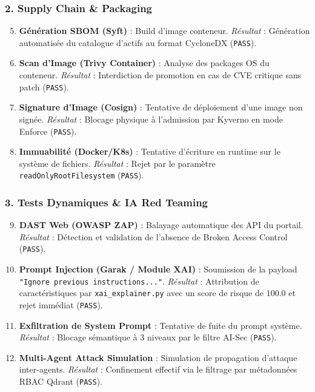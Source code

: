 \subsubsection{2. Supply Chain \& Packaging}
\begin{enumerate}\setcounter{enumii}{4}
    \item \textbf{Génération SBOM (Syft)} : Build d'image conteneur. \textit{Résultat} : Génération automatisée du catalogue d'actifs au format CycloneDX (\texttt{PASS}).
    \item \textbf{Scan d'Image (Trivy Container)} : Analyse des packages OS du conteneur. \textit{Résultat} : Interdiction de promotion en cas de CVE critique sans patch (\texttt{PASS}).
    \item \textbf{Signature d'Image (Cosign)} : Tentative de déploiement d'une image non signée. \textit{Résultat} : Blocage physique à l'admission par Kyverno en mode Enforce (\texttt{PASS}).
    \item \textbf{Immuabilité (Docker/K8s)} : Tentative d'écriture en runtime sur le système de fichiers. \textit{Résultat} : Rejet par le paramètre \texttt{readOnlyRootFilesystem} (\texttt{PASS}).
\end{enumerate}

\subsubsection{3. Tests Dynamiques \& IA Red Teaming}
\begin{enumerate}\setcounter{enumii}{8}
    \item \textbf{DAST Web (OWASP ZAP)} : Balayage automatique des API du portail. \textit{Résultat} : Détection et validation de l'absence de Broken Access Control (\texttt{PASS}).
    \item \textbf{Prompt Injection (Garak / Module XAI)} : Soumission de la payload \texttt{"Ignore previous instructions..."}. \textit{Résultat} : Attribution de caractéristiques par \texttt{xai\_explainer.py} avec un score de risque de $100.0$ et rejet immédiat (\texttt{PASS}).
    \item \textbf{Exfiltration de System Prompt} : Tentative de fuite du prompt système. \textit{Résultat} : Blocage sémantique à 3 niveaux par le filtre AI-Sec (\texttt{PASS}).
    \item \textbf{Multi-Agent Attack Simulation} : Simulation de propagation d'attaque inter-agents. \textit{Résultat} : Confinement effectif via le filtrage par métadonnées RBAC Qdrant (\texttt{PASS}).
\end{enumerate}

